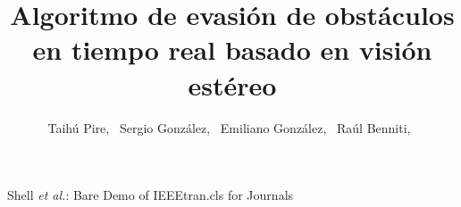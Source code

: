 \documentclass[journal]{IEEEtran}
\begin{document}
%
\title{Algoritmo de evasi\'on de obst\'aculos en tiempo real basado en visi\'on est\'ereo}
%
%
%

\author{Taih\'u Pire,~
        Sergio Gonz\'alez,~
        Emiliano Gonz\'alez,~
        Ra\'ul Benniti,~%
        }

% 
%



%
{Shell \MakeLowercase{\textit{et al.}}: Bare Demo of IEEEtran.cls for Journals}
% 
\end{document}
